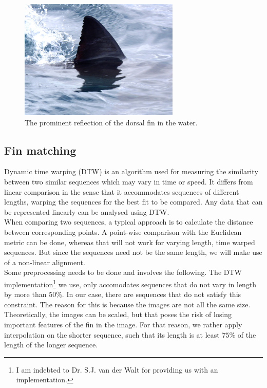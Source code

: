 \documentclass[a4paper,10pt]{article}
\begin{document}
\begin{figure}[H]
 \centering
 \includegraphics[width=3in]{reflectfin.jpg}
 \caption{The prominent reflection of the dorsal fin in the water.}
 \label{shadow}
\end{figure} 

\subsection{Fin matching}
Dynamic time warping (DTW) is an algorithm used for
measuring the similarity between two similar sequences which may vary in time or
speed.  It differs from linear comparison in the
sense that it accommodates sequences of different lengths, warping the
sequences for the best fit to be compared.
Any data that can be represented linearly can be analysed using DTW.  \\

When comparing two sequences, a typical approach is to calculate the distance
between corresponding points. A point-wise comparison with the Euclidean
metric can be done, whereas that will not work for varying length, time warped sequences.  But since the sequences
need not be the same length, we will make use of a non-linear
alignment. \\

Some preprocessing needs to be done and involves the following.
The DTW implementation\footnote{I am indebted to
  Dr. S.J. van der Walt for providing us with an implementation.} we use, only accomodates
sequences that do not vary in length by more than $50\%$. In our case, there are sequences
that do not satisfy this constraint.  The reason for this is because the images are not all the same size.
Theoretically, the images can be scaled, but that poses the risk of losing important features of the fin in the image.
For that reason, we rather apply interpolation on the shorter sequence, 
 such that its length is at least $75\%$ of the length of the longer sequence. 
 
\end{document}

